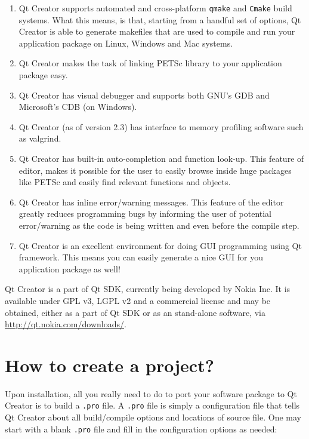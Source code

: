 {{\begin{enumerate}
\item Qt Creator supports automated and cross-platform \texttt{qmake} and \texttt{Cmake} build systems. What this means, is that, starting from a handful set of options, Qt Creator is able to generate makefiles that are used to compile and run your application package on Linux, Windows and Mac systems.
\item Qt Creator makes the task of linking PETSc library to your application package easy.
\item Qt Creator has visual debugger and supports both GNU's GDB and Microsoft's CDB (on Windows).
\item Qt Creator (as of version 2.3) has interface to memory profiling software such as valgrind.
\item Qt Creator has built-in auto-completion and function look-up. This feature of editor, makes it possible for the user to easily browse inside huge packages like PETSc and easily find relevant functions and objects.
\item Qt Creator has inline error/warning messages. This feature of the editor greatly reduces programming bugs by informing the user of potential error/warning as the code is being written and even before the compile step.
\item Qt Creator is an excellent environment for doing GUI programming using Qt framework. This means you can easily generate a nice GUI for you application package as well!
\end{enumerate}

Qt Creator is a part of Qt SDK, currently being developed by Nokia Inc. It is available under GPL v3, LGPL v2 and a commercial license and may be obtained, either as a part of Qt SDK or as an stand-alone software, via \url{http://qt.nokia.com/downloads/}.

\section*{How to create a project?}
Upon installation, all you really need to do to port your software package to Qt Creator is to build a \texttt{.pro} file. A \texttt{.pro} file is simply a configuration file that tells Qt Creator about all build/compile options and locations of source file. One may start with a blank \texttt{.pro} file and fill in the configuration options as needed:

\begin{lstlisting}


\end{lstlisting}}}
